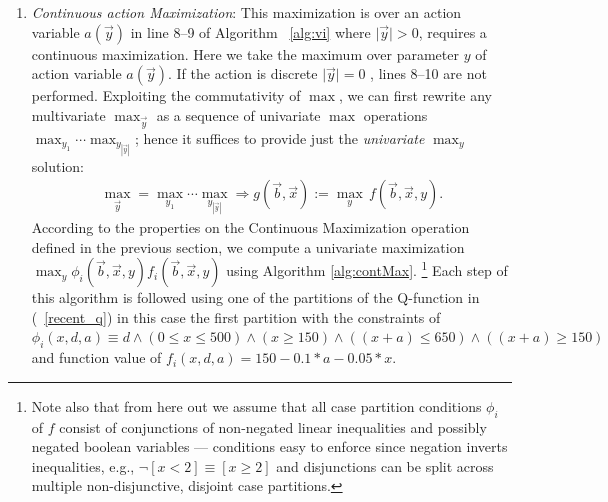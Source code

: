 \documentclass[twoside,11pt]{article}
\begin{document}
\begin{enumerate}
\begin{algorithm}[t!]
{      \;
}
\caption{\footnotesize \texttt{Continuous Maximization}($y$, $f(\vec{b},\vec{x},y)$) $\longrightarrow(max_{y}f(\vec{b},\vec{x},y))$ \label{alg:contMax}}
\vspace{-1mm}
\end{algorithm}
\decmargin{.5em}

\item {\it Continuous action Maximization}: This maximization is over an action variable $a(\vec{y})$ in line 8--9 of
Algorithm ~\ref{alg:vi} where $\mid \vec{y} \mid>0$, requires a continuous maximization. Here we take the maximum over parameter $y$ of action variable $a(\vec{y})$. If the action is discrete $\mid \vec{y} \mid=0$ , lines 8--10 are not performed.
Exploiting the commutativity of $\max$, we can first
rewrite any multivariate $\max_{\vec{y}}$ as a sequence of univariate
$\max$ operations $\max_{y_1} \cdots \max_{y_{|\vec{y}|}}$; hence it
suffices to provide just the \emph{univariate} $\max_y$ solution:
\begin{align}
\max_{\vec{y}} =\max_{y_1} \cdots \max_{y_{|\vec{y}|}} \Rightarrow g(\vec{b},\vec{x}) := \max_{y} \, f(\vec{b},\vec{x},y). \nonumber
\end{align}
According to the properties on the Continuous Maximization operation defined in the previous section, we compute a univariate maximization  
$\max_y \phi_i(\vec{b},\vec{x},y) f_i(\vec{b},\vec{x},y)$ using Algorithm \ref{alg:contMax}. 
\footnote{Note also that from here out we assume that all case partition conditions $\phi_i$ of
$f$ consist of conjunctions of non-negated linear inequalities and
possibly negated boolean variables --- conditions easy to enforce
since negation inverts inequalities, e.g., $\neg [x < 2] \equiv [x \geq 2]$
and disjunctions can be split across multiple non-disjunctive, 
disjoint case partitions.} 
Each step of this algorithm is followed using one of the partitions of the Q-function in (~\ref{recent_q}) in this case the first partition with the constraints of 
$\phi_i(x,d,a) \equiv d \land (0 \leq x \leq 500) \land (x \geq 150) \land ((x+a) \leq 650) \land ((x+a) \geq 150) $ and function value of $ f_i(x,d,a) = 150 - 0.1 * a - 0.05 * x$.


\end{enumerate}
\end{document}
